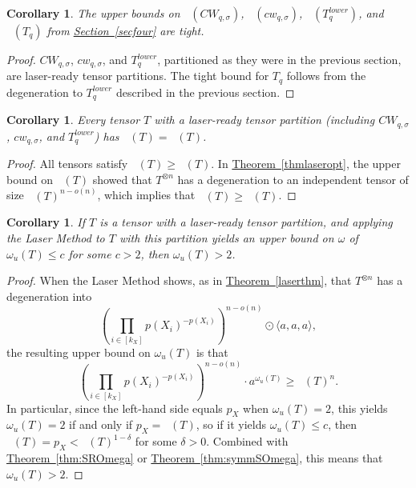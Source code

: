 \documentclass[11pt]{article}
\numberwithin{equation}{section}
\newtheorem{corollary}[theorem]{Corollary}
\theoremstyle{definition}
\theoremstyle{plain}
\newcommand{\expref}[2]{\hyperref[#2]{#1~\ref{#2}}}
\newcommand{\trr}{\mathop{\tilde{\operatorname{R}}}}
\newcommand{\tsr}{\mathop{\tilde{\operatorname{S}}}}
\newcommand{\tqr}{\mathop{\tilde{\operatorname{Q}}}}
\theoremstyle{definition}
\begin{document}
\begin{corollary}
The upper bounds on $\tsr(CW_{q,\sigma})$, $\tsr(cw_{q,\sigma})$, $\tsr(T_q^{lower})$, and $\tsr(T_q)$ from \expref{Section}{secfour} are tight.
\end{corollary}

\begin{proof}
$CW_{q,\sigma}$, $cw_{q,\sigma}$, and $T_q^{lower}$, partitioned as they were in the previous section, are laser-ready tensor partitions. The tight bound for $T_q$ follows from the degeneration to $T_q^{lower}$ described in the previous section.
\end{proof}

\begin{corollary} \label{subrankcorr}
Every tensor $T$ with a laser-ready tensor partition (including $CW_{q,\sigma}$, $cw_{q,\sigma}$, and $T_q^{lower}$) has $\tsr(T) = \tqr(T)$.
\end{corollary}

\begin{proof}
All tensors satisfy $\tsr(T) \geq \tqr(T)$. In \expref{Theorem}{thmlaseropt}, the upper bound on $\tsr(T)$ showed that $T^{\otimes n}$ has a degeneration to an independent tensor of size $\tsr(T)^{n - o(n)}$, which implies that $\tqr(T) \geq \tsr(T)$.
\end{proof}

\begin{corollary}
If $T$ is a tensor with a laser-ready tensor partition, and applying the Laser Method to $T$ with this partition yields an upper bound on $\omega$ of $\omega_u(T) \leq c$ for some $c>2$, then $\omega_u(T) > 2$.
\end{corollary}

\begin{proof}
When the Laser Method shows, as in \expref{Theorem}{laserthm}, that $T^{\otimes n}$ has a degeneration into $$\left(\prod_{i \in [k_X]} p(X_i)^{-p(X_i)}\right)^{n - o(n)} \odot \langle a,a,a \rangle,$$
the resulting upper bound on $\omega_u(T)$ is that $$\left(\prod_{i \in [k_X]} p(X_i)^{-p(X_i)}\right)^{n - o(n)} \cdot a^{\omega_u(T)} \geq \trr(T)^n.$$
In particular, since the left-hand side equals $p_X$ when $\omega_u(T)=2$, this yields $\omega_u(T)=2$ if and only if $p_X = \trr(T)$, so if it yields $\omega_u(T) \leq c$, then $\tsr(T) = p_X < \trr(T)^{1-\delta}$ for some $\delta>0$. Combined with \expref{Theorem}{thm:SROmega} or \expref{Theorem}{thm:symmSOmega}, this means that $\omega_u(T)>2$.
\end{proof}
\end{document}
